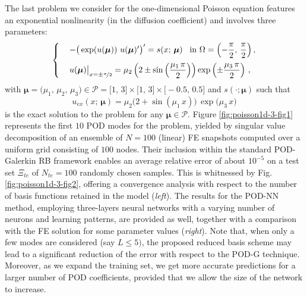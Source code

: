 \documentclass[12pt, a4paper, twoside, openright, notitlepage]{report}
\numberwithin{equation}{chapter}
\theoremstyle{theorem}
\theoremstyle{definition}
\theoremstyle{remark}
\theoremstyle{proposition}
\numberwithin{figure}{chapter}
\newcommand{\bg}[1]{\boldsymbol{#1}}
\begin{document}
		The last problem we consider for the one-dimensional Poisson equation features an exponential nonlinearity (in the diffusion coefficient) and involves three parameters:
		\begin{equation}
			\label{eq:poisson1d-3}
			\begin{cases}
				& - \big( \exp(u(\bg{\mu})) ~ u(\bg{\mu})' \big)' = s(x; \, \bg{\mu}) \hspace*{0.3cm} \text{in $\Omega = \left( -\dfrac{\pi}{2}, \, \dfrac{\pi}{2} \right)$} \, , \\[0.3cm]
				& u(\bg{\mu}) \big|_{x = \pm \nicefrac{\pi}{2}} = \mu_2 \left( 2 \pm \sin\left( \dfrac{\mu_1 \, \pi}{2} \right) \right) \exp \left( \pm \dfrac{\mu_3 \, \pi}{2} \right) \, ,
			\end{cases}
		\end{equation}
		with $\bg{\mu} = \big(\mu_1, \, \mu_2, \, \mu_3 \big) \in \mathcal{P} = \big[ 1, \, 3 \big] \times \big[ 1, \, 3 \big] \times \big[ -0.5, \, 0.5 \big]$ and $s(\cdot; \bg{\mu})$ such that \[ u_{ex}(x; \, \bg{\mu}) = \mu_2 \big( 2 + \sin(\mu_1 \, x) \big) \, \exp \big( \mu_3 \, x \big) \] is the exact solution to the problem for any $\bg{\mu} \in \mathcal{P}$. Figure \ref{fig:poisson1d-3-fig1} represents the first $10$ POD modes for the problem, yielded by singular value decomposition of an ensemble of $N = 100$ (linear) FE snapshots computed over a uniform grid consisting of $100$ nodes. Their inclusion within the standard POD-Galerkin RB framework enables an average relative error of about $10^{-5}$ on a test set $\Xi_{te}$ of $N_{te} = 100$ randomly chosen samples. This is whitnessed by Fig. \ref{fig:poisson1d-3-fig2}, offering a convergence analysis with respect to the number of basis functions retained in the model (\emph{left}). The results for the POD-NN method, employing three-layers neural networks with a varying number of neurons and learning patterns, are provided as well, together with a comparison with the FE solution for some parameter values (\emph{right}). Note that, when only a few modes are considered (say $L \leq 5)$, the proposed reduced basis scheme may lead to a significant reduction of the error with respect to the POD-G technique. Moreover, as we expand the training set, we get more accurate predictions for a larger number of POD coefficients, provided that we allow the size of the network to increase. 
		
		\vspace*{-0.15cm}
		
\end{document}
